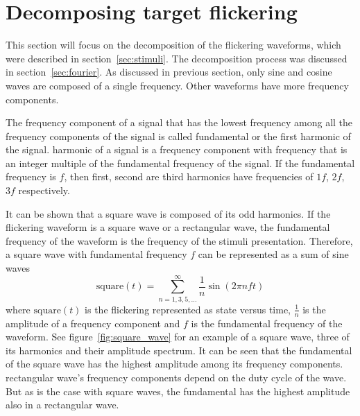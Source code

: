 

\section{Decomposing target flickering}
\label{sec:decomposition}

This section will focus on the decomposition of the \glspl{flickering waveform}, which were described in section~\ref{sec:stimuli}. The decomposition process was discussed in section~\ref{sec:fourier}. As discussed in previous section, only sine and cosine waves are composed of a single frequency. Other waveforms have more \glspl{frequency component}.

The \gls{frequency component} of a signal that has the lowest frequency among all the \glspl{frequency component} of the signal is called \gls{fundamental} or the first \gls{harmonic} of the signal. \Gls{harmonic} of a signal is a \gls{frequency component} with frequency that is an integer multiple of the \gls{fundamental} frequency of the signal. If the \gls{fundamental} frequency is $f$, then first, second are third \glspl{harmonic} have frequencies of $1f$, $2f$, $3f$ respectively.

It can be shown that a \gls{square wave} is composed of its odd \glspl{harmonic}. If the \gls{flickering waveform} is a \gls{square wave} or a \gls{rectangular wave}, the \gls{fundamental} frequency of the waveform is the frequency of the stimuli presentation. Therefore, a \gls{square wave} with \gls{fundamental} frequency $f$ can be represented as a sum of sine waves
\begin{equation}
	\label{eq:square}
	\mbox{square}(t) = \sum_{n=1,3,5,\dots}^{\infty}\frac{1}{n} \sin(2\pi nft)
\end{equation}
where $\mbox{square}(t)$ is the \gls{flickering} represented as \gls{state} versus time, $\frac{1}{n}$ is the amplitude of a \gls{frequency component} and $f$ is the \gls{fundamental} frequency of the waveform. See figure~\ref{fig:square_wave} for an example of a \gls{square wave}, three of its \glspl{harmonic} and their amplitude spectrum. It can be seen that the \gls{fundamental} of the square wave has the highest amplitude among its \glspl{frequency component}. \Gls{rectangular wave}'s \glspl{frequency component} depend on the \gls{duty cycle} of the wave. But as is the case with \glspl{square wave}, the \gls{fundamental} has the highest amplitude also in a \gls{rectangular wave}.


